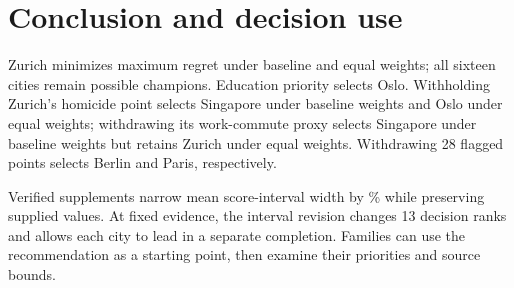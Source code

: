 \section{Conclusion and decision use}
Zurich minimizes maximum regret under baseline and equal weights; all sixteen
cities remain possible champions. Education priority selects Oslo. Withholding
Zurich's homicide point selects Singapore under baseline weights and Oslo under
equal weights; withdrawing its work-commute proxy selects Singapore under
baseline weights but retains Zurich under equal weights. Withdrawing 28 flagged points
selects Berlin and Paris, respectively.

Verified supplements narrow mean score-interval width by \TotalWidthReduction\%
while preserving supplied values. At fixed evidence, the interval revision changes
13 decision ranks and allows each city to lead in a separate completion.
Families can use the recommendation as a starting point, then examine their
priorities and source bounds.
